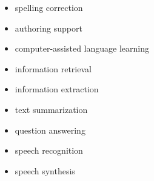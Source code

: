 \documentclass[]{../metanetpaper}
\begin{document}
\begin{itemize}
\item spelling correction
\item authoring support
\item computer-assisted language learning
\item information retrieval 
\item information extraction
\item text summarization
\item question answering
\item speech recognition 
\item speech synthesis 
\end{itemize}
	
\end{document}
